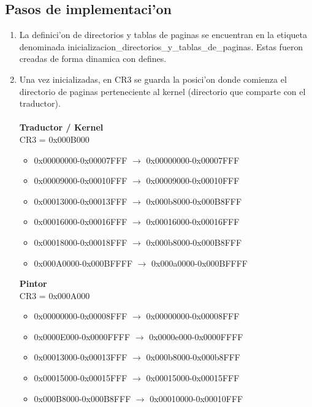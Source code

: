 \documentclass[11pt]{article}
\begin{document}
\subsection{Pasos de implementaci'on}
\begin{enumerate}
\item La definici'on de directorios y tablas de paginas se encuentran en la etiqueta denominada  inicializacion\_directorios\_y\_tablas\_de\_paginas. Estas fueron creadas de forma dinamica con defines.
\item Una vez inicializadas, en CR3 se guarda la posici'on donde comienza el directorio de paginas perteneciente al kernel (directorio que comparte con el traductor).\\
\\
\textbf{Traductor / Kernel} \\
	CR3 = 0x000B000 \\
\begin{itemize}
\item 0x00000000-0x00007FFF	$\rightarrow$ 0x00000000-0x00007FFF \\
\item 0x00009000-0x00010FFF	$\rightarrow$ 0x00009000-0x00010FFF \\
\item 0x00013000-0x00013FFF	$\rightarrow$ 0x000b8000-0x000B8FFF \\
\item 0x00016000-0x00016FFF	$\rightarrow$ 0x00016000-0x00016FFF \\
\item 0x00018000-0x00018FFF	$\rightarrow$ 0x000b8000-0x000B8FFF \\
\item 0x000A0000-0x000BFFFF	$\rightarrow$ 0x000a0000-0x000BFFFF \\
\end{itemize}
\textbf{Pintor} \\
	CR3 = 0x000A000 \\
\begin{itemize}
\item 0x00000000-0x00008FFF 	$\rightarrow$ 0x00000000-0x00008FFF \\
\item 0x0000E000-0x0000FFFF	$\rightarrow$ 0x0000e000-0x0000FFFF \\
\item 0x00013000-0x00013FFF	$\rightarrow$ 0x000b8000-0x000b8FFF \\
\item 0x00015000-0x00015FFF	$\rightarrow$ 0x00015000-0x00015FFF \\
\item 0x000B8000-0x000B8FFF	$\rightarrow$ 0x00010000-0x00010FFF \\
\end{itemize}


\end{enumerate}
\end{document}
